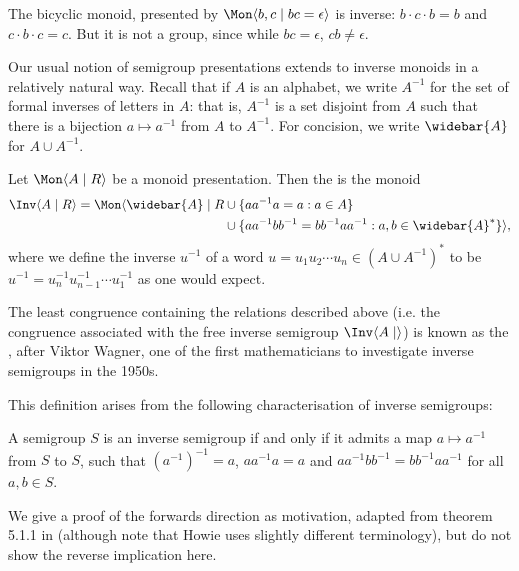 \documentclass[noindex,noinsetproof,12pt]{lmaths}
\newcommand{\Abar}{\widebar{A}}
\begin{document}
\begin{example}
The bicyclic monoid, presented by $\Mon \langle b, c \mid bc = \epsilon \rangle$  is inverse: $b\cdot c\cdot b = b$ and $c\cdot b \cdot c = c$. But it is not a group, since while $bc = \epsilon$, $cb \ne \epsilon$.
\end{example}

Our usual notion of semigroup presentations extends to inverse monoids in a relatively natural way. Recall that if $A$ is an alphabet, we write $A^{-1}$ for the set of formal inverses of letters in $A$: that is, $A^{-1}$ is a set disjoint from $A$ such that there is a bijection $a \mapsto a^{-1}$ from $A$ to $A^{-1}$. For concision, we write $\Abar$ for $A \cup A^{-1}$.

\begin{defn}
	Let $\Mon \langle A \mid R \rangle$ be a monoid presentation. Then the  is the monoid
	\begin{align*}
		\Inv \langle A \mid R \rangle = \Mon \langle \Abar \mid R &\cup \{ aa^{-1}a = a : a \in A \} \\
		&\cup \{ aa^{-1}bb^{-1} = bb^{-1}aa^{-1} : a, b \in \Abar^* \}\rangle,
	\end{align*}
	where we define the inverse $u^{-1}$ of a word $u = u_1u_2\cdots u_n \in (A \cup A^{-1})^*$ to be $u^{-1} = u_n^{-1} u_{n-1}^{-1} \cdots u_1^{-1}$ as one would expect.
\end{defn}

The least congruence containing the relations described above (i.e. the congruence associated with the free inverse semigroup $\Inv \langle A \mid\rangle$) is known as the , after Viktor Wagner, one of the first mathematicians to investigate inverse semigroups in the 1950s.

This definition arises from the following characterisation of inverse semigroups:
\begin{theorem} \label{thm:inv-semigp-cond}
	A semigroup $S$ is an inverse semigroup if and only if it admits a map $a \mapsto a^{-1}$ from $S$ to $S$, such that $(a^{-1})^{-1} = a$, $aa^{-1}a = a$ and $aa^{-1}bb^{-1} = bb^{-1}aa^{-1}$ for all $a, b \in S$.
\end{theorem}

We give a proof of the forwards direction as motivation, adapted from theorem 5.1.1 in \cite{Howie1995} (although note that Howie uses slightly different terminology), but do not show the reverse implication here.
\end{document}
